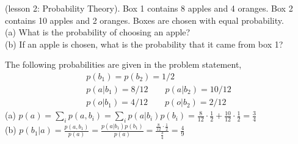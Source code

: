 \documentclass[a4paper]{article}
\begin{document}
\begin{ExerciseList}





\Exercise[label={ex:apples-oranges}] (lesson 2: Probability Theory). Box 1 contains 8 apples and 4 oranges. Box 2 contains 10 apples
and 2 oranges. Boxes are chosen with equal probability.\\
(a) What is the probability of choosing an
apple?\\
(b) If an apple is chosen, what is the probability that it came from box 1?

\Answer[ref={ex:apples-oranges}] The following probabilities are given in the problem statement,
\begin{gather*}
p(b_1)=p(b_2)=1/2\\
p(a|b_1) = 8/12 \qquad p(a|b_2)=10/12\\
p(o|b_1) = 4/12 \qquad p(o|b_2)=2/12
\end{gather*}
(a) $p(a) = \sum_i p(a,b_i) = \sum_i p(a|b_i)p(b_i)=\frac{8}{12}\cdot\frac{1}{2} + \frac{10}{12}\cdot\frac{1}{2} = \frac{3}{4}$\\
(b) $p(b_1|a) = \frac{p(a,b_1)}{p(a)} = \frac{p(a|b_1)p(b_1)}{p(a)} = \frac{\frac{8}{12}\cdot\frac{1}{2}}{\frac{3}{4}} = \frac{4}{9}$





\end{ExerciseList}
\end{document}
